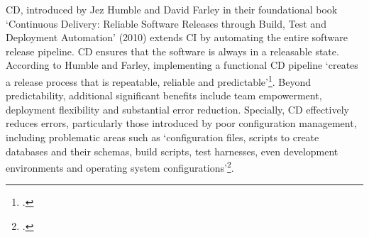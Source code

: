 \ac{CD}, introduced by Jez Humble and David Farley in their foundational book `Continuous Delivery: Reliable Software Releases through Build, Test and Deployment Automation' (2010)
extends \ac{CI} by automating the entire software release pipeline. \ac{CD} ensures that the software is always in a releasable state.
According to Humble and Farley, implementing a functional \ac{CD} pipeline `creates a release process that is repeatable, reliable and predictable'\footcite[17]{humbleContinuousDeliveryReliable2010}.
Beyond predictability, additional significant benefits include team empowerment, deployment flexibility and substantial error reduction.
Specially, \ac{CD} effectively reduces errors, particularly those introduced by poor configuration management, including problematic areas such as
`configuration files, scripts to create databases and their schemas, build scripts, test harnesses, even development environments and operating system configurations'\footcite[19]{humbleContinuousDeliveryReliable2010}.

